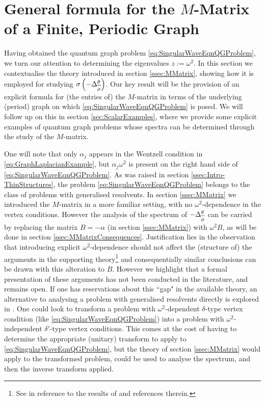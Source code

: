 \section{General formula for the $M$-Matrix of a Finite, Periodic Graph} \label{sec:ScalarDiscussion}
Having obtained the quantum graph problem \eqref{eq:SingularWaveEqnQGProblem}, we turn our attention to determining the eigenvalues $z := \omega^2$.
In this section we contextualise the theory introduced in section \ref{ssec:MMatrix}, showing how it is employed for studying $\sigma\left( -\Delta_{\widetilde{\mu}}^{\theta} \right)$.
Our key result will be the provision of an explicit formula for (the entries of) the $M$-matrix in terms of the underlying (period) graph on which \eqref{eq:SingularWaveEqnQGProblem} is posed.
We will follow up on this in section \ref{sec:ScalarExamples}, where we provide some explicit examples of quantum graph problems whose spectra can be determined through the study of the $M$-matrix.

One will note that only $\alpha_j$ appears in the Wentzell condition in \eqref{eq:GraphLaplacianExample}, but $\alpha_j\omega^2$ is present on the right hand side of \eqref{eq:SingularWaveEqnQGProblem}.
As was raised in section \ref{ssec:Intro-ThinStructures}, the problem \eqref{eq:SingularWaveEqnQGProblem} belongs to the class of problems with generalised resolvents.
In section \ref{ssec:MMatrix} we introduced the $M$-matrix in a more familiar setting, with no $\omega^2$-dependence in the vertex conditions.
However the analysis of the spectrum of $-\Delta_{\widetilde{\mu}}^{\theta}$ can be carried by replacing the matrix $B=-\alpha$ (in section \ref{ssec:MMatrix}) with $\omega^2 B$, as will be done in section \ref{ssec:MMatrixConsequences}.
Justification lies in the observation that introducing explicit $\omega^2$-dependence should not affect the (structure of) the arguments in the supporting theory\footnote{See \cite[page 1846]{cherednichenko2018effective} in reference to the results of \cite{ryzhov2009weyl} and references therein.} and consequentially similar conclusions can be drawn with this alteration to $B$.
However we highlight that a formal presentation of these arguments has not been conducted in the literature, and remains open.
If one has reservations about this ``gap" in the available theory, an alternative to analysing a problem with generalised resolvents directly is explored in \cite[Section 6]{cherednichenko2017norm}.
One could look to transform a problem with $\omega^2$-dependent $\delta$-type vertex condition (like \eqref{eq:SingularWaveEqnQGProblem}) into a problem with $\omega^2$-independent $\delta'$-type vertex conditions.
This comes at the cost of having to determine the appropriate (unitary) transform to apply to \eqref{eq:SingularWaveEqnQGProblem}, but the theory of section \ref{ssec:MMatrix} would apply to the transformed problem, could be used to analyse the spectrum, and then the inverse transform applied.

